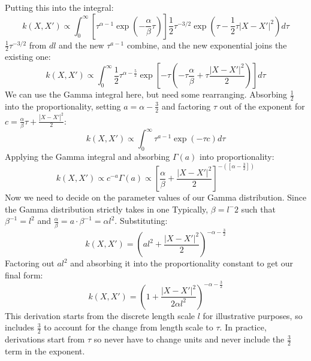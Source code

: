 Putting this into the integral:
\begin{equation*}
    k(X,X') \propto \int_{0}^{\infty}  \left[ \tau^{\alpha - 1} \exp \left(-\frac{\alpha}{\beta} \tau \right) \right] \frac{1}{2}\tau^{-3/2} \exp \left( \tau - \frac{1}{2} \tau |X - X'|^2 \right) d\tau
\end{equation*}
$\frac{1}{2}\tau^{-3/2}$ from $dl$ and the new $\tau^{a-1}$ combine, and the new exponential joins the existing one:
\begin{equation*}
    k(X,X') \propto \int_{0}^{\infty} \frac{1}{2} \tau^{\alpha - \frac{5}{2}} \exp \left[ -\tau \left( -\tau\frac{\alpha}{\beta} + \tau \frac{|X - X'|^2}{2} \right) \right] d\tau
\end{equation*}
We can use the Gamma integral here, but need some rearranging. Absorbing $\frac{1}{2}$ into the proportionality, setting $a = \alpha - \frac{3}{2}$ and factoring $\tau$ out of the exponent for $c = \frac{\alpha}{\beta}\tau + \frac{|X - X'|^2}{2}$:
\begin{equation*}
    k(X,X') \propto \int_{0}^{\infty} \tau^{a - 1} \exp ( -\tau c ) d\tau
\end{equation*}
Applying the Gamma integral and absorbing $\Gamma(a)$ into proportionality:
\begin{equation*}
    k(X,X') \propto c^{-a} \Gamma(a) \propto \left[ \frac{\alpha}{\beta} + \frac{|X - X'|^2}{2} \right]^{-\left( \left[ \alpha - \frac{3}{2} \right] \right)} 
\end{equation*}
Now we need to decide on the parameter values of our Gamma distribution. Since the Gamma distribution strictly takes in one Typically, $\beta = l^-2$ such that $\beta^{-1} = l^2$ and $\frac{\alpha}{\beta} = a \cdot \beta^{-1} = \alpha l^2$. Substituting:
\begin{equation*}
    k(X,X') = \left( al^2 + \frac{|X - X'|^2}{2} \right)^{-\alpha - \frac{3}{2}}
\end{equation*}
Factoring out $al^2$ and absorbing it into the proportionality constant to get our final form:
\begin{equation*}
    k(X,X') = \left( 1 + \frac{|X - X'|^2}{2\alpha l^2} \right)^{-\alpha - \frac{3}{2}}
\end{equation*}
This derivation starts from the discrete length scale $l$ for illustrative purposes, so includes $\frac{3}{2}$ to account for the change from length scale to $\tau$. In practice, derivations start from $\tau$ so never have to change units and never include the $\frac{3}{2}$ term in the exponent.

